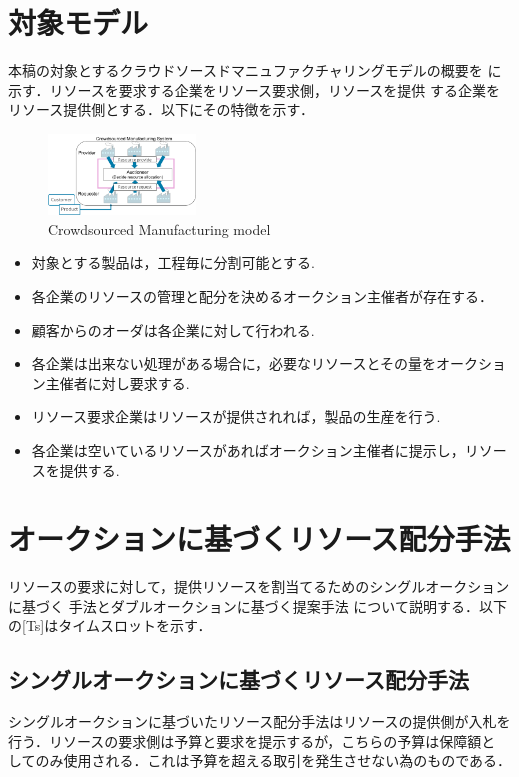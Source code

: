 \documentclass{ujarticle}
\begin{document}
\section{対象モデル}
本稿の対象とするクラウドソースドマニュファクチャリングモデルの概要を
に示す．リソースを要求する企業をリソース要求側，リソースを提供
する企業をリソース提供側とする．以下にその特徴を示す．
\begin{figure}[H]
  \centering
  \includegraphics[width=0.35\textwidth]{CsMfg.pdf} 
  \caption{Crowdsourced Manufacturing model}
  \label{fig:CsMfg}
\end{figure}
\begin{itemize}
  \item {対象とする製品は，工程毎に分割可能とする.}
  \item {各企業のリソースの管理と配分を決めるオークション主催者が存在する．}
  \item {顧客からのオーダは各企業に対して行われる.}
  \item {各企業は出来ない処理がある場合に，必要なリソースとその量をオークショ
      ン主催者に対し要求する.} 
  \item {リソース要求企業はリソースが提供されれば，製品の生産を行う.}
  \item {各企業は空いているリソースがあればオークション主催者に提示し，リソースを提供する.}
\end{itemize}
\section{オークションに基づくリソース配分手法}
リソースの要求に対して，提供リソースを割当てるためのシングルオークションに基づく
手法とダブルオークションに基づく提案手法
について説明する．以下の[Ts]はタイムスロットを示す．
\subsection{シングルオークションに基づくリソース配分手法}
シングルオークションに基づいたリソース配分手法はリソースの提供側が入札を行う．リソースの要求側は予算と要求を提示するが，こちらの予算は保障額と
してのみ使用される．これは予算を超える取引を発生させない為のものである．
\end{document}
